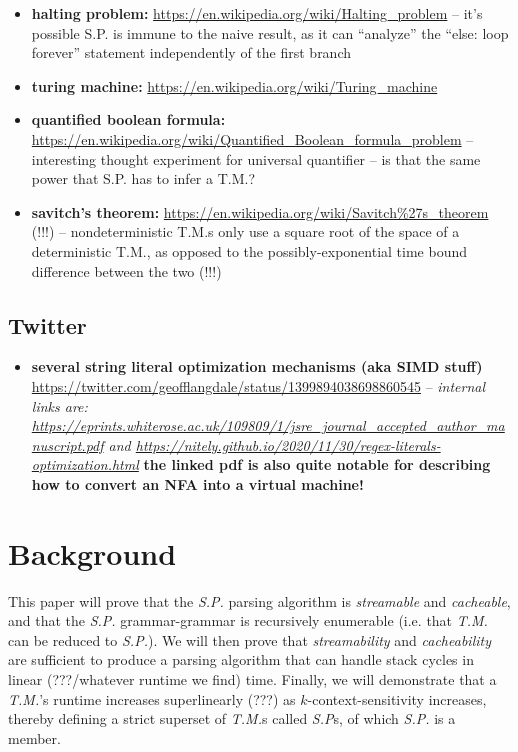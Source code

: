 \documentclass{article}
\begin{document}
\begin{itemize}
  \item \textbf{halting problem:} \url{https://en.wikipedia.org/wiki/Halting\_problem} -- it's possible S.P. is immune to the naive result, as it can ``analyze'' the ``else: loop forever'' statement independently of the first branch
  \item \textbf{turing machine:} \url{https://en.wikipedia.org/wiki/Turing\_machine}
  \item \textbf{quantified boolean formula:} \url{https://en.wikipedia.org/wiki/Quantified\_Boolean\_formula\_problem} -- interesting thought experiment for universal quantifier -- is that the same power that S.P. has to infer a T.M.?
  \item \textbf{savitch's theorem:} \url{https://en.wikipedia.org/wiki/Savitch\%27s\_theorem} (!!!) -- nondeterministic T.M.s only use a square root of the space of a deterministic T.M., as opposed to the possibly-exponential time bound difference between the two (!!!)
\end{itemize}

\subsection{Twitter}
\begin{itemize}
  \item \textbf{several string literal optimization mechanisms (aka SIMD stuff)} \url{https://twitter.com/geofflangdale/status/1399894038698860545} -- \textit{internal links are: \url{https://eprints.whiterose.ac.uk/109809/1/jsre_journal_accepted_author_manuscript.pdf} and \url{https://nitely.github.io/2020/11/30/regex-literals-optimization.html}} \textbf{the linked pdf is also quite notable for describing how to convert an NFA into a virtual machine!}
\end{itemize}

\section{Background}
This paper will prove that the \textit{S.P.} parsing algorithm is \textit{streamable} and \textit{cacheable}, and that the \textit{S.P.} grammar-grammar is recursively enumerable (i.e. that \textit{T.M.} can be reduced to \textit{S.P.}). We will then prove that \textit{streamability} and \textit{cacheability} are sufficient to produce a parsing algorithm that can handle stack cycles in linear (???/whatever runtime we find) time. Finally, we will demonstrate that a \textit{T.M.}'s runtime increases superlinearly (???) as $k$-context-sensitivity increases, thereby defining a strict superset of \textit{T.M.}s called \textit{S.P}s, of which \textit{S.P.} is a member.
\end{document}
